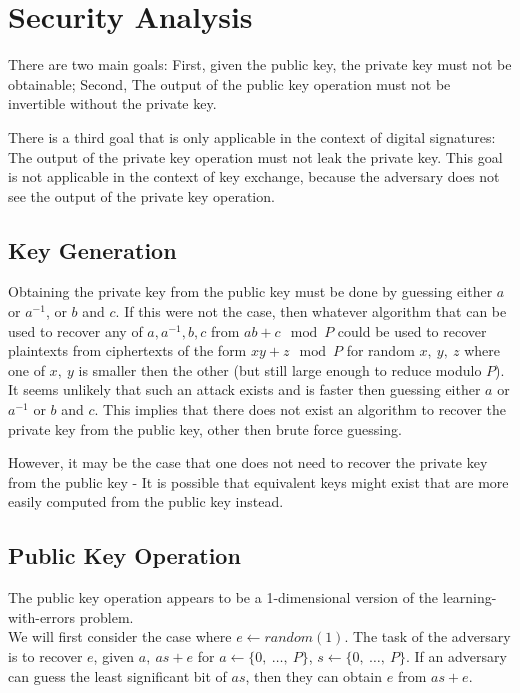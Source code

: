 \documentclass[preprint]{iacrtrans}
\begin{document}
\section{Security Analysis}
There are two main goals: First, given the public key, the private key must not be obtainable; Second, The output of the public key operation must not be invertible without the private key.

There is a third goal that is only applicable in the context of digital signatures: The output of the private key operation must not leak the private key. This goal is not applicable in the context of key exchange, because the adversary does not see the output of the private key operation.

\subsection{Key Generation}
Obtaining the private key from the public key must be done by guessing either $a$ or $a^{-1}$, or $b$ and $c$. If this were not the case, then whatever algorithm that can be used to recover any of $a, a^{-1}, b, c$ from $a b + c \mod P$ could be used to recover plaintexts from ciphertexts of the form $x y + z \mod P$ for random $x,\ y,\ z$ where one of $x,\ y$ is smaller then the other (but still large enough to reduce modulo $P$). It seems unlikely that such an attack exists and is faster then guessing either $a$ or $a^{-1}$ or $b$ and $c$. This implies that there does not exist an algorithm to recover the private key from the public key, other then brute force guessing.

However, it may be the case that one does not need to recover the private key from the public key - It is possible that equivalent keys might exist that are more easily computed from the public key instead.

\subsection{Public Key Operation}
The public key operation appears to be a 1-dimensional version of the learning-with-errors problem.\\

We will first consider the case where $e \leftarrow random(1)$. The task of the adversary is to recover $e$, given $a,\ a s + e$ for $a \leftarrow \{0,\ \dots,\ P\}$, $s \leftarrow \{0,\ \dots,\ P\}$. If an adversary can guess the least significant bit of $a s$, then they can obtain $e$ from $a s + e$.
\end{document}
